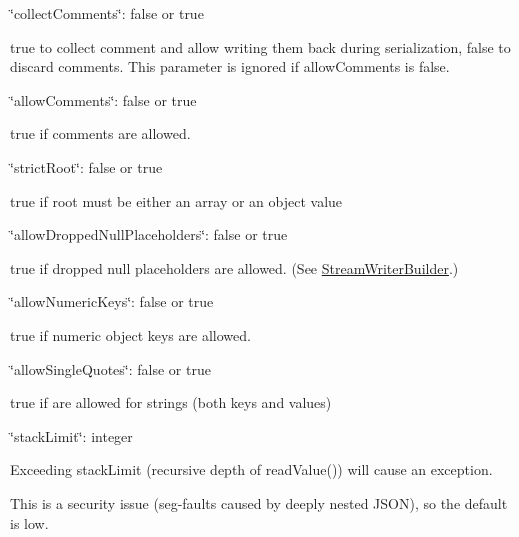 \begin{DoxyItemize}
\item {\ttfamily \char`\"{}collect\+Comments\char`\"{}\+: false or true}
\begin{DoxyItemize}
\item true to collect comment and allow writing them back during serialization, false to discard comments. This parameter is ignored if allow\+Comments is false.
\end{DoxyItemize}
\item {\ttfamily \char`\"{}allow\+Comments\char`\"{}\+: false or true}
\begin{DoxyItemize}
\item true if comments are allowed.
\end{DoxyItemize}
\item {\ttfamily \char`\"{}strict\+Root\char`\"{}\+: false or true}
\begin{DoxyItemize}
\item true if root must be either an array or an object value
\end{DoxyItemize}
\item {\ttfamily \char`\"{}allow\+Dropped\+Null\+Placeholders\char`\"{}\+: false or true}
\begin{DoxyItemize}
\item true if dropped null placeholders are allowed. (See \hyperlink{classJson_1_1StreamWriterBuilder}{Stream\+Writer\+Builder}.)
\end{DoxyItemize}
\item {\ttfamily \char`\"{}allow\+Numeric\+Keys\char`\"{}\+: false or true}
\begin{DoxyItemize}
\item true if numeric object keys are allowed.
\end{DoxyItemize}
\item {\ttfamily \char`\"{}allow\+Single\+Quotes\char`\"{}\+: false or true}
\begin{DoxyItemize}
\item true if \textquotesingle{}\textquotesingle{} are allowed for strings (both keys and values)
\end{DoxyItemize}
\item {\ttfamily \char`\"{}stack\+Limit\char`\"{}\+: integer}
\begin{DoxyItemize}
\item Exceeding stack\+Limit (recursive depth of {\ttfamily read\+Value()}) will cause an exception.
\item This is a security issue (seg-\/faults caused by deeply nested J\+S\+ON), so the default is low.

\end{DoxyItemize}
\end{DoxyItemize}
